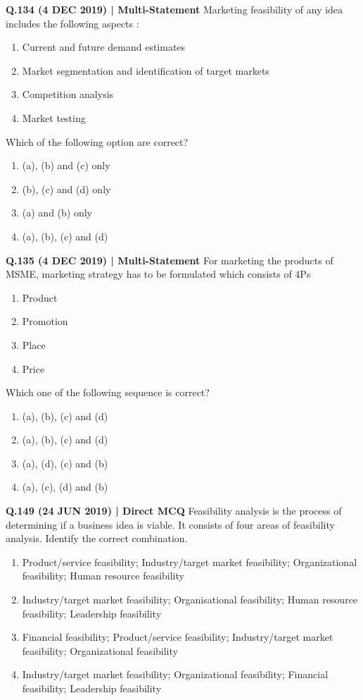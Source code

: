\documentclass{article}
\begin{document}
\textbf{Q.134 (4 DEC 2019) | Multi-Statement}
Marketing feasibility of any idea includes the following aspects :
\begin{enumerate}[label=(\alph*)]
    \item Current and future demand estimates
    \item Market segmentation and identification of target markets
    \item Competition analysis
    \item Market testing
\end{enumerate}
Which of the following option are correct?
\begin{enumerate}[label=(\arabic*)]
    \item (a), (b) and (c) only
    \item (b), (c) and (d) only
    \item (a) and (b) only
    \item (a), (b), (c) and (d)
\end{enumerate}

\textbf{Q.135 (4 DEC 2019) | Multi-Statement}
For marketing the products of MSME, marketing strategy has to be formulated which consists of 4Ps
\begin{enumerate}[label=(\alph*)]
    \item Product
    \item Promotion
    \item Place
    \item Price
\end{enumerate}
Which one of the following sequence is correct?
\begin{enumerate}[label=(\arabic*)]
    \item (a), (b), (c) and (d)
    \item (a), (b), (c) and (d)
    \item (a), (d), (c) and (b)
    \item (a), (c), (d) and (b)
\end{enumerate}

\textbf{Q.149 (24 JUN 2019) | Direct MCQ}
Feasibility analysis is the process of determining if a business idea is viable. It consists of four areas of feasibility analysis. Identify the correct combination.
\begin{enumerate}[label=(\arabic*)]
    \item Product/service feasibility; Industry/target market feasibility; Organizational feasibility; Human resource feasibility
    \item Industry/target market feasibility; Organisational feasibility; Human resource feasibility; Leadership feasibility
    \item Financial feasibility; Product/service feasibility; Industry/target market feasibility; Organizational feasibility
    \item Industry/target market feasibility; Organizational feasibility; Financial feasibility; Leadership feasibility
\end{enumerate}
\end{document}
